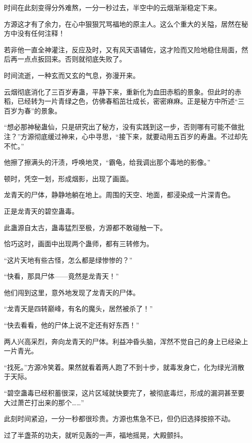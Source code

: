 
\begin{this_body}

时间在此刻变得分外难熬，一分一秒过去，半空中的云烟渐渐稳定下来。

方源这才有了余力，在心中狠狠咒骂福地的原主人。这么个重大的关隘，居然在秘方中没有任何注释！

若非他一直全神灌注，反应及时，又有风天语辅佐，这才险而又险地稳住局面，然后再一点点扳回来。否则就彻底失败了。

时间流逝，一种玄而又玄的气息，弥漫开来。

云烟彻底消化了三百岁寿蛊，平静下来，重新化为血田赤稻的景象。但此时的赤稻，已经转为一片青绿之色，仿佛春稻茁壮成长，密密麻麻。正是秘方中所述“三百岁为春”的景象。

“想必那神秘蛊仙，只是研究出了秘方，没有实践到这一步，否则哪有可能不做批注？”方源彻底缓过神来，心中寻思，“接下来，就要动用五百岁的寿蛊。不过却先不忙。”

他擦了擦满头的汗渍，呼唤地灵，“霸龟，给我调出那个毒地的影像。”

顿时，凭空一划，形成烟影，出现了画面。

龙青天的尸体，静静地躺在地上。周围的天空、地面，都浸染成一片深青色。

正是龙青天的碧空蛊毒。

此蛊源自太古，蛊毒猛烈至极，方源都不敢碰触一下。

恰巧这时，画面中出现两个蛊师，都有三转修为。

“这片天地有些古怪，怎么都是绿惨惨的？”

“快看，那具尸体——竟然是龙青天！”

他们闯到这里，意外地发现了龙青天的尸体。

“龙青天是四转巅峰，有名的魔头，居然被杀了！”

“快去看看，他的尸体上说不定还有好东西！”

两人兴高采烈，奔向龙青天的尸体。利益冲昏头脑，浑然不觉自己的身上已经染上一片青光。

“找死。”方源冷笑着。果然就看着两人跑了不到十步，就毒发身亡，化为绿光消散于天际。

“碧空蛊毒已经积蓄很深，这片区域就快要完了，被彻底毒烂，形成的漏洞甚至要大过萧芒打出来的那个……”

此刻时间紧迫，一分一秒都很珍贵。方源也焦急不已，但仍旧选择按捺不动。

过了半盏茶的功夫，就听见轰的一声，福地摇晃，大殿颤抖。


\end{this_body}
